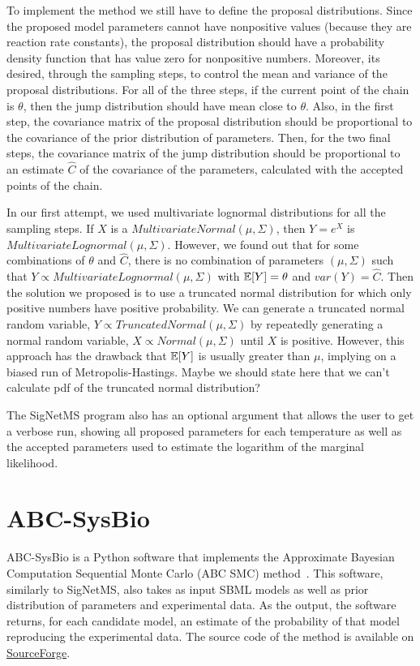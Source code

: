 To implement the method we still have to define the proposal 
distributions. Since the proposed model parameters cannot have 
nonpositive values (because they are reaction rate constants), the 
proposal distribution should have a probability density function that 
has value zero for nonpositive numbers. Moreover, its desired, through 
the sampling steps, to control the mean and variance of the proposal 
distributions. For all of the three steps, if the current point of the
chain is $\theta$, then the jump distribution should have mean close
to $\theta$. Also, in the first step, the covariance matrix  of the 
proposal distribution should be proportional to the covariance of 
the prior distribution of parameters. Then, for the two final steps, the 
covariance matrix of the jump distribution should be proportional to an
estimate $\hat{C}$ of the covariance of the parameters, calculated with 
the accepted points of the chain.

In our first attempt, we used multivariate lognormal distributions for 
all the sampling steps. If $X$ is a $MultivariateNormal (\mu, \Sigma)$, 
then $Y = e^{X}$ is $MultivariateLognormal (\mu, \Sigma)$. However, we 
found out that for some combinations of $\theta$ and $\hat{C}$, there 
is no combination of parameters $(\mu, \Sigma)$ such that $Y \propto 
MultivariateLognormal (\mu, \Sigma)$ with $\mathbb{E}[Y] = \theta$ and
$var(Y) = \hat{C}$. Then the solution we proposed is to use a truncated 
normal distribution for which only positive numbers have positive 
probability. We can generate a truncated normal random variable, 
$Y \propto TruncatedNormal (\mu, \Sigma)$ by 
repeatedly generating a normal random variable, $X \propto Normal(\mu, 
\Sigma)$ until $X$ is positive. However, this approach has the drawback 
that  $\mathbb{E}[Y]$ is usually greater than $\mu$, implying on a 
biased run of Metropolis-Hastings.
{\color{blue} Maybe we should state here that we can't calculate pdf of
the truncated normal distribution?}

The SigNetMS program also has an optional argument that allows the user
to get a verbose run, showing all proposed parameters for each 
temperature as well as the accepted parameters used to estimate the 
logarithm of the marginal likelihood. 

\section{ABC-SysBio}
ABC-SysBio is a Python software that implements the Approximate Bayesian
Computation Sequential Monte Carlo (ABC SMC) method~\cite{Liepe2010}. 
This software, similarly to SigNetMS, also takes as input SBML models as 
well as prior distribution of parameters and experimental data. As the 
output, the software returns, for each candidate model, an estimate of 
the probability of that model reproducing the experimental data. The 
source code of the method is available on 
\href{https://sourceforge.net/projects/abc-sysbio/files/}{SourceForge}.

